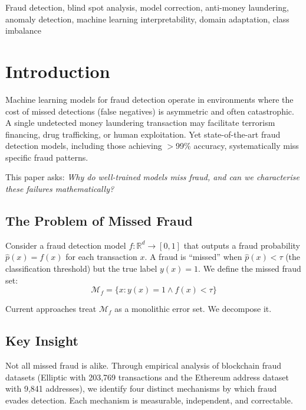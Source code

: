 \documentclass[journal]{IEEEtran}
\newcommand{\R}{\mathbb{R}}
\begin{document}
\begin{IEEEkeywords}
Fraud detection, blind spot analysis, model correction, anti-money laundering, anomaly detection, machine learning interpretability, domain adaptation, class imbalance
\end{IEEEkeywords}

\section{Introduction}
\label{sec:introduction}

Machine learning models for fraud detection operate in environments where the cost of missed detections (false negatives) is asymmetric and often catastrophic. A single undetected money laundering transaction may facilitate terrorism financing, drug trafficking, or human exploitation. Yet state-of-the-art fraud detection models, including those achieving $>$99\% accuracy, systematically miss specific fraud patterns.

This paper asks: \textit{Why do well-trained models miss fraud, and can we characterise these failures mathematically?}

\subsection{The Problem of Missed Fraud}
\label{ssec:missed_fraud}

Consider a fraud detection model $f: \R^d \to [0,1]$ that outputs a fraud probability $\hat{p}(x) = f(x)$ for each transaction $x$. A fraud is ``missed'' when $\hat{p}(x) < \tau$ (the classification threshold) but the true label $y(x) = 1$. We define the missed fraud set:
\begin{equation}
  \mathcal{M}_f = \{x : y(x) = 1 \wedge f(x) < \tau\}
  \label{eq:missed_set}
\end{equation}

Current approaches treat $\mathcal{M}_f$ as a monolithic error set. We decompose it.

\subsection{Key Insight}
\label{ssec:key_insight}

Not all missed fraud is alike. Through empirical analysis of blockchain fraud datasets (Elliptic with 203{,}769 transactions and the Ethereum address dataset~\cite{musayev2022ethfraud} with 9{,}841 addresses), we identify four distinct mechanisms by which fraud evades detection. Each mechanism is measurable, independent, and correctable.
\end{document}
